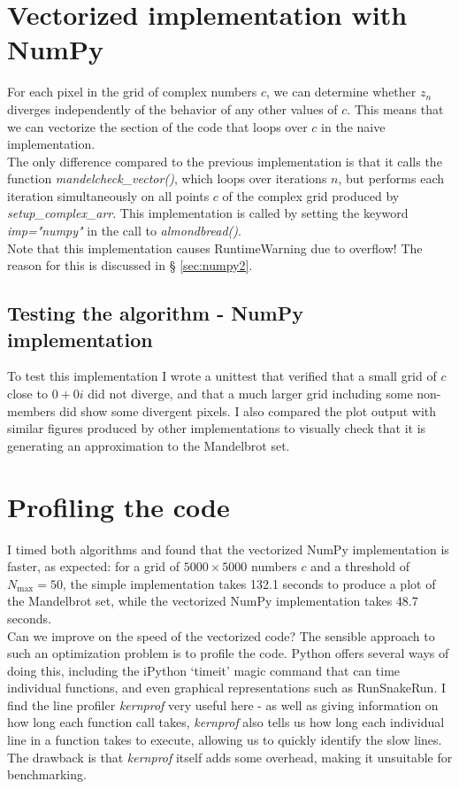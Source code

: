 \documentclass[paper=a4, fontsize=11pt]{scrartcl} %
\numberwithin{equation}{section} %
\numberwithin{figure}{section} %
\numberwithin{table}{section} %
\begin{document}
\section{Vectorized implementation with NumPy}\label{sec:numpy}

For each pixel in the grid of complex numbers $c$, we can determine whether $z_n$ diverges independently of the behavior of any other values of $c$. This means that we can vectorize the section of the code that loops over $c$ in the naive implementation.\\

The only difference compared to the previous implementation is that it calls the function \emph{mandelcheck\_vector()}, which loops over iterations $n$, but performs each iteration simultaneously on all points $c$ of the complex grid produced by \emph{setup\_complex\_arr}. This implementation is called by setting the keyword \emph{imp="numpy"} in the call to \emph{almondbread()}.\\ 

Note that this implementation causes RuntimeWarning due to overflow! The reason for this is discussed in § \ref{sec:numpy2}.

\subsection{Testing the algorithm - NumPy implementation}

To test this implementation I wrote a unittest that verified that a small grid of $c$ close to $0+0i$ did not diverge, and that a much larger grid including some non-members did show some divergent pixels. I also compared the plot output with similar figures produced by other implementations to visually check that it is generating an approximation to the Mandelbrot set.

\section{Profiling the code}\label{sec:profiling}

I timed both algorithms and found that the vectorized NumPy implementation is faster, as expected: for a grid of $5000\times5000$ numbers $c$ and a threshold of $N_\mathrm{max}=50$, the simple implementation takes 132.1 seconds to produce a plot of the Mandelbrot set, while the vectorized NumPy implementation takes 48.7 seconds.\\

Can we improve on the speed of the vectorized code? The sensible approach to such an optimization problem is to profile the code. Python offers several ways of doing this, including the iPython `timeit' magic command that can time individual functions, and even graphical representations such as RunSnakeRun. I find the line profiler \emph{kernprof} very useful here - as well as giving information on how long each function call takes, \emph{kernprof} also tells us how long each individual line in a function takes to execute, allowing us to quickly identify the slow lines. The drawback is that \emph{kernprof} itself adds some overhead, making it unsuitable for benchmarking.\\
\end{document}

